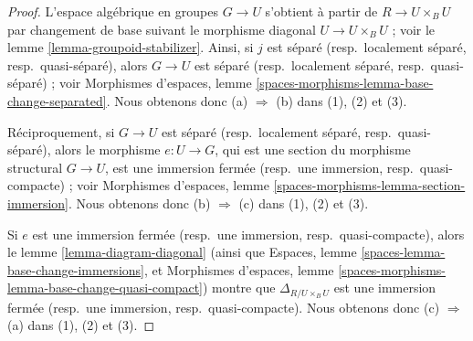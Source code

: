 \begin{proof}
L'espace algébrique en groupes $G \to U$ s'obtient à partir de
$R \to U \times_B U$ par changement de base suivant le morphisme diagonal
$U \to U \times_B U$ ; voir le lemme \ref{lemma-groupoid-stabilizer}. Ainsi,
si $j$ est séparé (resp.\ localement séparé, resp.\ quasi-séparé), alors
$G \to U$ est séparé (resp.\ localement séparé, resp.\ quasi-séparé) ; voir
Morphismes d'espaces, lemme
\ref{spaces-morphisms-lemma-base-change-separated}. Nous obtenons donc
(a) $\Rightarrow$ (b) dans (1), (2) et (3).

\medskip\noindent
Réciproquement, si $G \to U$ est séparé (resp.\ localement séparé,
resp.\ quasi-séparé), alors le morphisme $e : U \to G$, qui est une section
du morphisme structural $G \to U$, est une immersion fermée (resp.\ une
immersion, resp.\ quasi-compacte) ; voir Morphismes d'espaces, lemme
\ref{spaces-morphisms-lemma-section-immersion}. Nous obtenons donc
(b) $\Rightarrow$ (c) dans (1), (2) et (3).

\medskip\noindent
Si $e$ est une immersion fermée (resp.\ une immersion, resp.\ quasi-compacte),
alors le lemme \ref{lemma-diagram-diagonal} (ainsi que Espaces, lemme
\ref{spaces-lemma-base-change-immersions}, et Morphismes d'espaces, lemme
\ref{spaces-morphisms-lemma-base-change-quasi-compact}) montre que
$\Delta_{R/U \times_B U}$ est une immersion fermée (resp.\ une immersion,
resp.\ quasi-compacte). Nous obtenons donc (c) $\Rightarrow$ (a) dans (1),
(2) et (3).
\end{proof}





















